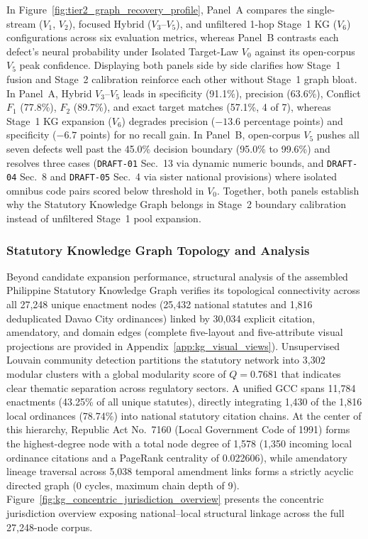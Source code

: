 In Figure~\ref{fig:tier2_graph_recovery_profile}, Panel~A compares the single-stream ($V_1$, $V_2$), focused Hybrid ($V_3$--$V_5$), and unfiltered 1-hop Stage~1 KG ($V_6$) configurations across six evaluation metrics, whereas Panel~B contrasts each defect's neural probability under Isolated Target-Law $V_0$ against its open-corpus $V_5$ peak confidence. Displaying both panels side by side clarifies how Stage~1 fusion and Stage~2 calibration reinforce each other without Stage~1 graph bloat. In Panel~A, Hybrid $V_3$--$V_5$ leads in specificity (91.1\%), precision (63.6\%), Conflict $F_1$ (77.8\%), $F_2$ (89.7\%), and exact target matches (57.1\%, 4 of 7), whereas Stage~1 KG expansion ($V_6$) degrades precision ($-13.6$ percentage points) and specificity ($-6.7$ points) for no recall gain. In Panel~B, open-corpus $V_5$ pushes all seven defects well past the 45.0\% decision boundary (95.0\% to 99.6\%) and resolves three cases (\texttt{DRAFT-01} Sec.~13 via dynamic numeric bounds, and \texttt{DRAFT-04} Sec.~8 and \texttt{DRAFT-05} Sec.~4 via sister national provisions) where isolated omnibus code pairs scored below threshold in $V_0$. Together, both panels establish why the Statutory Knowledge Graph belongs in Stage~2 boundary calibration instead of unfiltered Stage~1 pool expansion.

\subsubsection{Statutory Knowledge Graph Topology and Analysis}
\label{sec:kg_topology_validation}
Beyond candidate expansion performance, structural analysis of the assembled Philippine Statutory Knowledge Graph verifies its topological connectivity across all 27,248 unique enactment nodes (25,432 national statutes and 1,816 deduplicated Davao City ordinances) linked by 30,034 explicit citation, amendatory, and domain edges (complete five-layout and five-attribute visual projections are provided in Appendix~\ref{app:kg_visual_views}). Unsupervised Louvain community detection partitions the statutory network into 3,302 modular clusters with a global modularity score of $Q = 0.7681$ that indicates clear thematic separation across regulatory sectors. A unified GCC spans 11,784 enactments (43.25\% of all unique statutes), directly integrating 1,430 of the 1,816 local ordinances (78.74\%) into national statutory citation chains. At the center of this hierarchy, Republic Act No.~7160 (Local Government Code of 1991) forms the highest-degree node with a total node degree of 1,578 (1,350 incoming local ordinance citations and a PageRank centrality of 0.022606), while amendatory lineage traversal across 5,038 temporal amendment links forms a strictly acyclic directed graph (0 cycles, maximum chain depth of 9). Figure~\ref{fig:kg_concentric_jurisdiction_overview} presents the concentric jurisdiction overview exposing national--local structural linkage across the full 27,248-node corpus.

